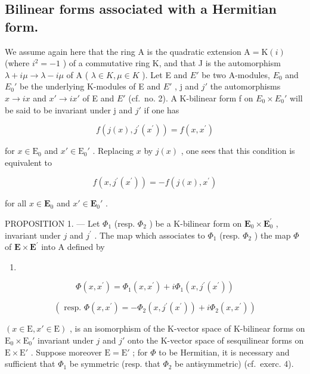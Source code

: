 \subsection{Bilinear forms associated with a Hermitian form.}

We assume again here that the ring A is the quadratic extension \(\mathrm{A} = \mathrm{K}(i)\) (where \(i^{2} = -1\) ) of a commutative ring K, and that J is the automorphism \(\lambda + i\mu \to \lambda - i\mu\) of A ( \(\lambda \in K, \mu \in K\) ). Let E and \(E'\) be two A-modules, \(E_{0}\) and \(E_{0}'\) be the underlying K-modules of E and \(E'\) , j and \(j'\) the automorphisms \(x \to ix\) and \(x' \to ix'\) of E and \(E'\) (cf.~no. 2). A K-bilinear form f on \(E_{0} \times E_{0}'\) will be said to be invariant under j and \(j'\) if one has

\[
f (j (x), j ^ {\prime} (x ^ {\prime})) = f (x, x ^ {\prime})\tag{5}
\]

for \(x \in \mathrm{E}_0\) and \(x' \in \mathrm{E}_0'\) . Replacing \(x\) by \(j(x)\) , one sees that this condition is equivalent to

\[
f (x, j ^ {\prime} (x ^ {\prime})) = - f (j (x), x ^ {\prime})\tag{6}
\]

for all \(x \in \mathbf{E}_0\) and \(x' \in \mathbf{E}_0'\) .

PROPOSITION 1. --- Let \(\Phi_{1}\) (resp. \(\Phi_{2}\) ) be a K-bilinear form on \(\mathbf{E}_{0} \times \mathbf{E}_{0}^{\prime}\) , invariant under \(j\) and \(j^{\prime}\) . The map which associates to \(\Phi_{1}\) (resp. \(\Phi_{2}\) ) the map \(\Phi\) of \(\mathbf{E} \times \mathbf{E}^{\prime}\) into A defined by

\begin{enumerate}
\def\labelenumi{(\arabic{enumi})}
\setcounter{enumi}{6}
\tightlist
\item
\end{enumerate}

\[
\Phi (x, x ^ {\prime}) = \Phi_ {1} (x, x ^ {\prime}) + i \Phi_ {1} (x, j ^ {\prime} (x ^ {\prime}))\tag{8}
\]

\[
(\text { resp. } \Phi (x, x ^ {\prime}) = - \Phi_ {2} (x, j ^ {\prime} (x ^ {\prime})) + i \Phi_ {2} (x, x ^ {\prime}))
\]

\((x \in \mathrm{E}, x' \in \mathrm{E})\) , is an isomorphism of the K-vector space of K-bilinear forms on \(\mathrm{E}_0 \times \mathrm{E}_0'\) invariant under \(j\) and \(j'\) onto the K-vector space of sesquilinear forms on \(\mathrm{E} \times \mathrm{E}'\) . Suppose moreover \(\mathrm{E} = \mathrm{E}'\) ; for \(\Phi\) to be Hermitian, it is necessary and sufficient that \(\Phi_1\) be symmetric (resp. that \(\Phi_2\) be antisymmetric) (cf.~exerc. 4).

